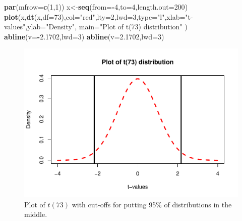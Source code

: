 \documentclass[]{book}
\newenvironment{Shaded}{\begin{snugshade}}{\end{snugshade}}
\newcommand{\KeywordTok}[1]{\textcolor[rgb]{0.13,0.29,0.53}{\textbf{#1}}}
\newcommand{\DataTypeTok}[1]{\textcolor[rgb]{0.13,0.29,0.53}{#1}}
\newcommand{\DecValTok}[1]{\textcolor[rgb]{0.00,0.00,0.81}{#1}}
\newcommand{\FloatTok}[1]{\textcolor[rgb]{0.00,0.00,0.81}{#1}}
\newcommand{\StringTok}[1]{\textcolor[rgb]{0.31,0.60,0.02}{#1}}
\newcommand{\OperatorTok}[1]{\textcolor[rgb]{0.81,0.36,0.00}{\textbf{#1}}}
\newcommand{\NormalTok}[1]{#1}
\begin{document}
\begin{Shaded}
\begin{Highlighting}[]
\KeywordTok{par}\NormalTok{(}\DataTypeTok{mfrow=}\KeywordTok{c}\NormalTok{(}\DecValTok{1}\NormalTok{,}\DecValTok{1}\NormalTok{))}
\NormalTok{x<-}\KeywordTok{seq}\NormalTok{(}\DataTypeTok{from=}\OperatorTok{-}\DecValTok{4}\NormalTok{,}\DataTypeTok{to=}\DecValTok{4}\NormalTok{,}\DataTypeTok{length.out=}\DecValTok{200}\NormalTok{)}
\KeywordTok{plot}\NormalTok{(x,}\KeywordTok{dt}\NormalTok{(x,}\DataTypeTok{df=}\DecValTok{73}\NormalTok{),}\DataTypeTok{col=}\StringTok{"red"}\NormalTok{,}\DataTypeTok{lty=}\DecValTok{2}\NormalTok{,}\DataTypeTok{lwd=}\DecValTok{3}\NormalTok{,}\DataTypeTok{type=}\StringTok{"l"}\NormalTok{,}\DataTypeTok{xlab=}\StringTok{"t-values"}\NormalTok{,}\DataTypeTok{ylab=}\StringTok{"Density"}\NormalTok{,}
     \DataTypeTok{main=}\StringTok{"Plot of t(73) distribution"}\NormalTok{ )}
\KeywordTok{abline}\NormalTok{(}\DataTypeTok{v=}\OperatorTok{-}\FloatTok{2.1702}\NormalTok{,}\DataTypeTok{lwd=}\DecValTok{3}\NormalTok{)}
\KeywordTok{abline}\NormalTok{(}\DataTypeTok{v=}\FloatTok{2.1702}\NormalTok{,}\DataTypeTok{lwd=}\DecValTok{3}\NormalTok{)}
\end{Highlighting}
\end{Shaded}

\begin{figure}
\centering
\includegraphics{GreenwoodBanner_files/figure-latex/Figure2-20-1.pdf}
\caption{\label{fig:Figure2-20}Plot of \(t(73)\) with cut-offs for putting 95\% of
distributions in the middle.}
\end{figure}
\end{document}
